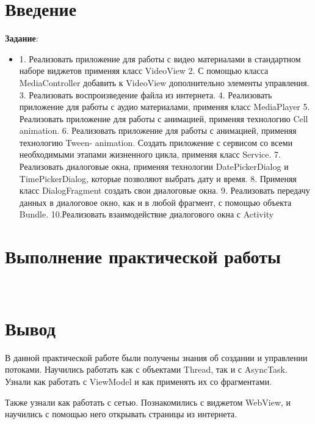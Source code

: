 \graphicspath{{./twelfth/img}}

\section*{\LARGE{Введение}}

\textbf{Задание}:
\begin{itemize}
	\item
1. Реализовать приложение для работы с видео материалами в
стандартном наборе виджетов применяя класс VideoView
2. С помощью класса MediaController добавить к VideoView
дополнительно элементы управления.
3. Реализовать воспроизведение файла из интернета.
4. Реализовать приложение для работы с аудио материалами, применяя
класс MediaPlayer
5. Реализовать приложение для работы с анимацией, применяя
технологию Cell animation.
6. Реализовать приложение для работы с анимацией, применяя
технологию Tween- animation. Создать приложение с сервисом со
всеми необходимыми этапами жизненного цикла, применяя класс
Service.
7. Реализовать диалоговые окна, применяя технологии DatePickerDialog и
TimePickerDialog, которые позволяют выбрать дату и время.
8. Применяя класс DialogFragment создать свои диалоговые окна.
9. Реализовать передачу данных в диалоговое окно, как и в любой
фрагмент, с помощью объекта Bundle.
10.Реализовать взаимодействие диалогового окна с Activity
\end{itemize}

\clearpage

\section*{\LARGE{Выполнение практической работы}}

\section{}

\begin{lstlisting}[language=Java
	, label=lst:
	]
\end{lstlisting}

\clearpage

\section*{\LARGE{Вывод}}
В данной практической работе были получены знания об создании и управлении
потоками. Научились работать как с объектами Thread, так и с AsyncTask.
Узнали как работать с ViewModel и как применять их со фрагментами.\par
Также узнали как работать с сетью. Познакомились с виджетом WebView,
и научились с помощью него открывать страницы из интернета.

